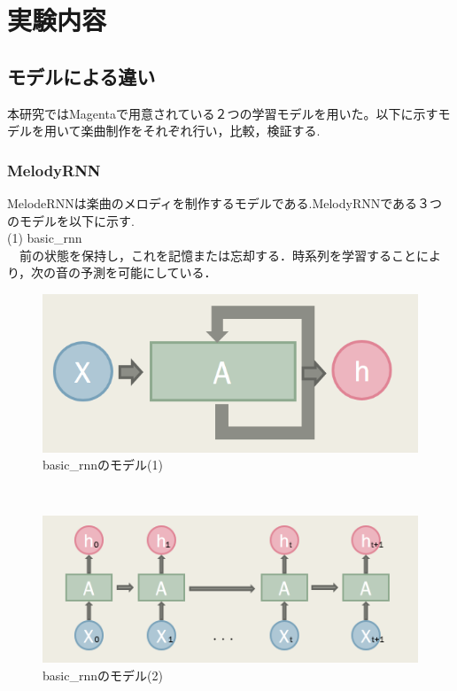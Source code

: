 \chapter{実験内容}
\section{モデルによる違い}
本研究ではMagentaで用意されている２つの学習モデルを用いた。以下に示すモデルを用いて楽曲制作をそれぞれ行い，比較，検証する.
\subsection{MelodyRNN}
MelodeRNNは楽曲のメロディを制作するモデルである.MelodyRNNである３つのモデルを以下に示す.\\
(1) basic\_rnn\\
　前の状態を保持し，これを記憶または忘却する．時系列を学習することにより，次の音の予測を可能にしている．
\begin{figure}[!ht]
    \begin{screen}
    \begin{center}
        \includegraphics[scale=1,clip]{./img/basic3.png}
        \caption{basic\_rnnのモデル(1)}
        \label{fig:basicrnnのモデル(1)}
    \end{center}
    \end{screen}
\end{figure}\\
\newpage
\begin{figure}[!ht]
    \begin{screen}
    \begin{center}
        \includegraphics[scale=0.8,clip]{./img/basic4.png}
        \caption{basic\_rnnのモデル(2)}
        \label{fig:basic_rnnのモデル(2)}
    \end{center}
    \end{screen}
\end{figure}

